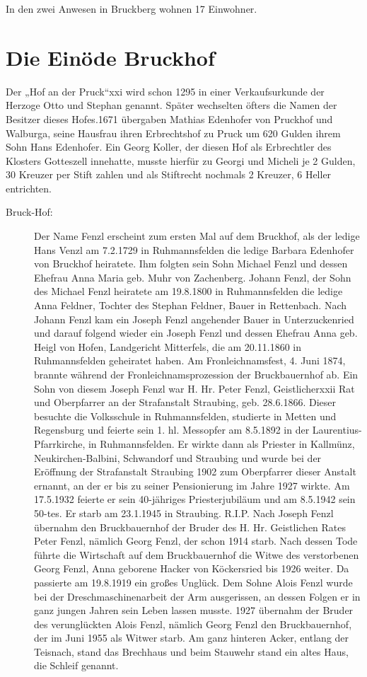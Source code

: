 \documentclass[12pt,a4pager]{book}
\begin{document}
In den zwei Anwesen in Bruckberg wohnen 17 Einwohner.

\section{Die Einöde Bruckhof}

Der „Hof an der Pruck“xxi wird schon 1295 in einer Verkaufsurkunde der Herzoge
Otto und Stephan genannt. Später wechselten öfters die Namen der Besitzer dieses
Hofes.1671 übergaben Mathias Edenhofer von Pruckhof und Walburga, seine Hausfrau
ihren Erbrechtshof zu Pruck um 620 Gulden ihrem Sohn Hans Edenhofer. Ein Georg
Koller, der diesen Hof als Erbrechtler des Klosters Gotteszell innehatte, musste
hierfür zu Georgi und Micheli je 2 Gulden, 30 Kreuzer per Stift zahlen und als
Stiftrecht nochmals 2 Kreuzer, 6 Heller entrichten.

\begin{description}
\item[Bruck-Hof:] Der Name Fenzl erscheint zum ersten Mal auf dem Bruckhof, als
der ledige Hans Venzl am 7.2.1729 in Ruhmannsfelden die ledige Barbara Edenhofer
von Bruckhof heiratete. Ihm folgten sein Sohn Michael Fenzl und dessen Ehefrau
Anna Maria geb. Muhr von Zachenberg. Johann Fenzl, der Sohn des Michael Fenzl
heiratete am 19.8.1800 in Ruhmannsfelden die ledige Anna Feldner, Tochter des
Stephan Feldner, Bauer in Rettenbach. Nach Johann Fenzl kam ein Joseph Fenzl
angehender Bauer in Unterzuckenried und darauf folgend wieder ein Joseph Fenzl
und dessen Ehefrau Anna geb. Heigl von Hofen, Landgericht Mitterfels, die am
20.11.1860 in Ruhmannsfelden geheiratet haben. Am Fronleichnamsfest, 4. Juni
1874, brannte während der Fronleichnamsprozession der Bruckbauernhof ab. Ein
Sohn von diesem Joseph Fenzl war H. Hr. Peter Fenzl, Geistlicherxxii Rat und
Oberpfarrer an der Strafanstalt Straubing, geb. 28.6.1866. Dieser besuchte die
Volksschule in Ruhmannsfelden, studierte in Metten und Regensburg und feierte
sein 1. hl. Messopfer am 8.5.1892 in der Laurentius-Pfarrkirche, in
Ruhmannsfelden. Er wirkte dann als Priester in Kallmünz, Neukirchen-Balbini,
Schwandorf und Straubing und wurde bei der Eröffnung der Strafanstalt Straubing
1902 zum Oberpfarrer dieser Anstalt ernannt, an der er bis zu seiner
Pensionierung im Jahre 1927 wirkte. Am 17.5.1932 feierte er sein 40-jähriges
Priesterjubiläum und am 8.5.1942 sein 50-tes. Er starb am 23.1.1945 in
Straubing. R.I.P. Nach Joseph Fenzl übernahm den Bruckbauernhof der Bruder des
H. Hr. Geistlichen Rates Peter Fenzl, nämlich Georg Fenzl, der schon 1914 starb.
Nach dessen Tode führte die Wirtschaft auf dem Bruckbauernhof die Witwe des
verstorbenen Georg Fenzl, Anna geborene Hacker von Köckersried bis 1926 weiter.
Da passierte am 19.8.1919 ein großes Unglück. Dem Sohne Alois Fenzl wurde bei
der Dreschmaschinenarbeit der Arm ausgerissen, an dessen Folgen er in ganz
jungen Jahren sein Leben lassen musste. 1927 übernahm der Bruder des
verunglückten Alois Fenzl, nämlich Georg Fenzl den Bruckbauernhof, der im Juni
1955 als Witwer starb. Am ganz hinteren Acker, entlang der Teisnach, stand das
Brechhaus und beim Stauwehr stand ein altes Haus, die Schleif genannt.
\end{description}
\end{document}
